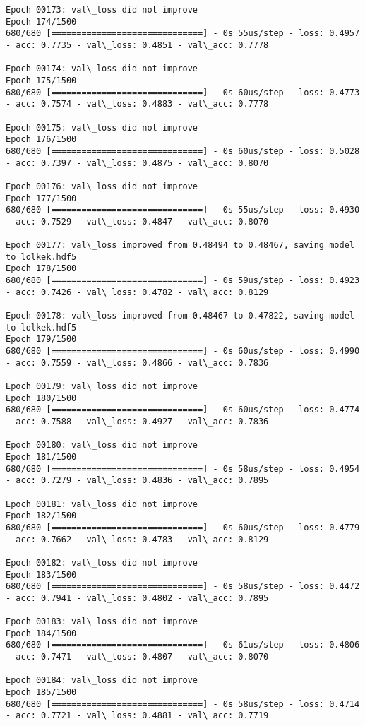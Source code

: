 \documentclass[11pt]{article}
\begin{document}
\begin{Verbatim}[commandchars=\\\{\}]
Epoch 00173: val\_loss did not improve
Epoch 174/1500
680/680 [==============================] - 0s 55us/step - loss: 0.4957 - acc: 0.7735 - val\_loss: 0.4851 - val\_acc: 0.7778

Epoch 00174: val\_loss did not improve
Epoch 175/1500
680/680 [==============================] - 0s 60us/step - loss: 0.4773 - acc: 0.7574 - val\_loss: 0.4883 - val\_acc: 0.7778

Epoch 00175: val\_loss did not improve
Epoch 176/1500
680/680 [==============================] - 0s 60us/step - loss: 0.5028 - acc: 0.7397 - val\_loss: 0.4875 - val\_acc: 0.8070

Epoch 00176: val\_loss did not improve
Epoch 177/1500
680/680 [==============================] - 0s 55us/step - loss: 0.4930 - acc: 0.7529 - val\_loss: 0.4847 - val\_acc: 0.8070

Epoch 00177: val\_loss improved from 0.48494 to 0.48467, saving model to lolkek.hdf5
Epoch 178/1500
680/680 [==============================] - 0s 59us/step - loss: 0.4923 - acc: 0.7426 - val\_loss: 0.4782 - val\_acc: 0.8129

Epoch 00178: val\_loss improved from 0.48467 to 0.47822, saving model to lolkek.hdf5
Epoch 179/1500
680/680 [==============================] - 0s 60us/step - loss: 0.4990 - acc: 0.7559 - val\_loss: 0.4866 - val\_acc: 0.7836

Epoch 00179: val\_loss did not improve
Epoch 180/1500
680/680 [==============================] - 0s 60us/step - loss: 0.4774 - acc: 0.7588 - val\_loss: 0.4927 - val\_acc: 0.7836

Epoch 00180: val\_loss did not improve
Epoch 181/1500
680/680 [==============================] - 0s 58us/step - loss: 0.4954 - acc: 0.7279 - val\_loss: 0.4836 - val\_acc: 0.7895

Epoch 00181: val\_loss did not improve
Epoch 182/1500
680/680 [==============================] - 0s 60us/step - loss: 0.4779 - acc: 0.7662 - val\_loss: 0.4783 - val\_acc: 0.8129

Epoch 00182: val\_loss did not improve
Epoch 183/1500
680/680 [==============================] - 0s 58us/step - loss: 0.4472 - acc: 0.7941 - val\_loss: 0.4802 - val\_acc: 0.7895

Epoch 00183: val\_loss did not improve
Epoch 184/1500
680/680 [==============================] - 0s 61us/step - loss: 0.4806 - acc: 0.7471 - val\_loss: 0.4807 - val\_acc: 0.8070

Epoch 00184: val\_loss did not improve
Epoch 185/1500
680/680 [==============================] - 0s 58us/step - loss: 0.4714 - acc: 0.7721 - val\_loss: 0.4881 - val\_acc: 0.7719


\end{Verbatim}
\end{document}

